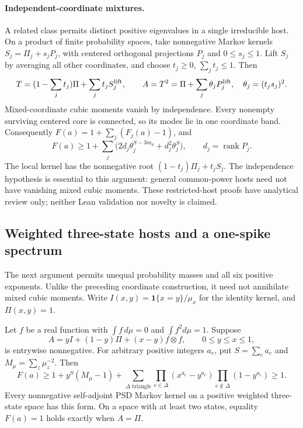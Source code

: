 \paragraph{Independent-coordinate mixtures.}
A related class permits distinct positive eigenvalues in a single
irreducible host.  On a product of finite probability spaces, take
nonnegative Markov kernels $S_j=\Pi_j+s_jP_j$, with centered orthogonal
projections $P_j$ and $0\leq s_j\leq1$.  Lift $S_j$ by averaging all
other coordinates, and choose $t_j\geq0$, $\sum_jt_j\leq1$.
Then
\[
 T=(1-\sum_jt_j)\Pi+\sum_jt_jS_j^{\rm lift},\qquad
 A=T^2=\Pi+\sum_j\theta_jP_j^{\rm lift},\quad\theta_j=(t_js_j)^2.
\]
Mixed-coordinate cubic moments vanish by independence.  Every nonempty
surviving centered core is connected, so its modes lie in one coordinate
band.  Consequently $F(a)=1+\sum_j(F_j(a)-1)$, and
\[
 F(a)\geq1+\sum_j
       \bigl(2d_j\theta_j^{S-3m_0}+d_j^2\theta_j^S\bigr),
 \qquad d_j=\operatorname{rank}P_j.
\]
The local kernel has the nonnegative root $(1-t_j)\Pi_j+t_jS_j$.
The independence hypothesis is essential to this argument: general
common-power hosts need not have vanishing mixed cubic moments.
These restricted-host proofs have analytical review only; neither Lean
validation nor novelty is claimed.

\subsection{Weighted three-state hosts and a one-spike spectrum}

The next argument permits unequal probability masses and all six positive
exponents.  Unlike the preceding coordinate construction, it need not
annihilate mixed cubic moments.  Write $I(x,y)=\mathbf1\{x=y\}/\mu_x$
for the identity kernel, and $\Pi(x,y)=1$.

\begin{proposition}
Let $f$ be a real function with $\int f\,d\mu=0$ and
$\int f^2d\mu=1$.  Suppose
\[
 A=yI+(1-y)\Pi+(x-y)f\otimes f,\qquad 0\leq y\leq x\leq1,
\]
is entrywise nonnegative.  For arbitrary positive integers $a_e$, put
$S=\sum_ea_e$ and $M_\mu=\sum_z\mu_z^{-2}$.  Then
\begin{equation}
 F(a)\geq1+y^S(M_\mu-1)
 +\sum_{\Delta\text{ triangle}}
    \prod_{e\in\Delta}(x^{a_e}-y^{a_e})
    \prod_{e\notin\Delta}(1-y^{a_e})\geq1.
 \label{eq:one-spike-common-powers}
\end{equation}
Every nonnegative self-adjoint PSD Markov kernel on a positive weighted
three-state space has this form.  On a space with at least two states,
equality $F(a)=1$ holds exactly when $A=\Pi$.
\end{proposition}

